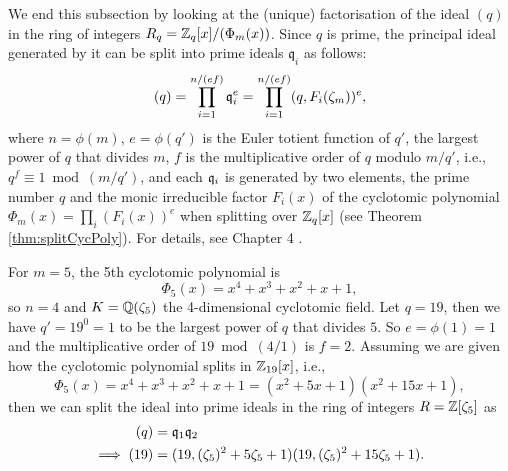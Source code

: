 \documentclass[../main.tex]{subfiles}
\begin{document}
We end this subsection by looking at the (unique) factorisation of the ideal $(q)$ in the ring of integers $R_q = \mathbb{Z}_q[x]/(\Phi_m(x))$.
Since $q$ is prime, the principal ideal generated by it can be split into prime ideals $\mathfrak{q}_i$ as follows: %
\begin{equation*}
    (q)=\prod_{i=1}^{n/(ef)} \mathfrak{q}_i^e = \prod_{i=1}^{n/(ef)} (q, F_i(\zeta_m))^e,
\end{equation*}
where $n = \phi(m)$, $e=\phi(q')$ is the Euler totient function of $q'$, the largest power of $q$ that divides $m$, $f$ is the multiplicative order of $q$ modulo $m/q'$, i.e., $q^f \equiv 1 \bmod (m/q')$,
and
each $\mathfrak{q}_i$ is generated by two elements, the prime number $q$ and the monic irreducible factor $F_i(x)$ of the cyclotomic polynomial $\Phi_m(x)= \prod_i (F_i(x))^e$ when splitting over $\mathbb{Z}_q[x]$ (see Theorem \ref{thm:splitCycPoly}). 
For details, see Chapter 4 \cite{stein2012algebraic}.

\begin{example}\label{ex:q ideal factorisation}
For $m=5$, the 5th cyclotomic polynomial is
\begin{equation*}
    \Phi_5(x)=x^4+x^3+x^2+x+1,
\end{equation*}
so $n=4$ and $K=\mathbb{Q}(\zeta_5)$ the 4-dimensional cyclotomic field. Let $q=19$, then we have $q'=19^0=1$ to be the largest power of $q$ that divides $5$. So $e=\phi(1)=1$ and the multiplicative order of $19 \bmod (4/1)$ is $f=2$. Assuming we are given how the cyclotomic polynomial splits in $\mathbb{Z}_{19}[x]$, i.e., 
\begin{equation*}
    \Phi_5(x)=x^4+x^3+x^2+x+1=(x^2+5x+1)(x^2+15x+1),
\end{equation*}
then we can split the ideal into prime ideals in the ring of integers $R=\mathbb{Z}[\zeta_5]$ as 
\begin{align*}
    (q)&=\mathfrak{q}_1 \mathfrak{q}_2 \\
    \implies (19)&=(19,(\zeta_5)^2+5\zeta_5+1)(19,(\zeta_5)^2+15\zeta_5+1).
\end{align*}
\end{example}
\end{document}
